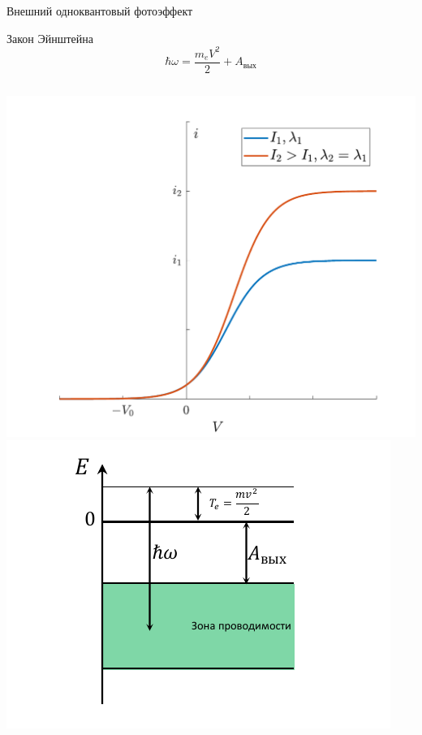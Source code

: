 \documentclass[12]{beamer}
\begin{document}
\begin{frame}[t]{Внешний одноквантовый фотоэффект}
\begin{block}{Закон Эйнштейна}
\begin{equation*}
    \hbar \omega = \dfrac{m_eV^2}{2} + A_{\text{вых}}
\end{equation*}
\end{block}
\begin{columns}[onlytextwidth]
\includegraphics[width=\textwidth]{Seminar_02/pics/pic_01.pdf}
\includegraphics[width=\textwidth]{Seminar_02/pics/pic_02.pdf}
\end{columns}
\end{frame}
\end{document}
